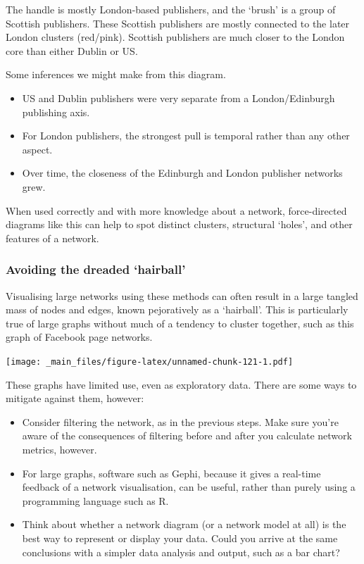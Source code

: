 \documentclass[
]{book}
\begin{document}
The handle is mostly London-based publishers, and the `brush' is a group of Scottish publishers. These Scottish publishers are mostly connected to the later London clusters (red/pink). Scottish publishers are much closer to the London core than either Dublin or US.

Some inferences we might make from this diagram.

\begin{itemize}
\item
  US and Dublin publishers were very separate from a London/Edinburgh publishing axis.
\item
  For London publishers, the strongest pull is temporal rather than any other aspect.
\item
  Over time, the closeness of the Edinburgh and London publisher networks grew.
\end{itemize}

When used correctly and with more knowledge about a network, force-directed diagrams like this can help to spot distinct clusters, structural `holes', and other features of a network.

\hypertarget{avoiding-the-dreaded-hairball}{%
\subsubsection{Avoiding the dreaded `hairball'}\label{avoiding-the-dreaded-hairball}}

Visualising large networks using these methods can often result in a large tangled mass of nodes and edges, known pejoratively as a `hairball'. This is particularly true of large graphs without much of a tendency to cluster together, such as this graph of Facebook page networks\citep{musae}.

\texttt{[image: \_main\_files/figure-latex/unnamed-chunk-121-1.pdf]}

These graphs have limited use, even as exploratory data. There are some ways to mitigate against them, however:

\begin{itemize}
\item
  Consider filtering the network, as in the previous steps. Make sure you're aware of the consequences of filtering before and after you calculate network metrics, however.
\item
  For large graphs, software such as Gephi, because it gives a real-time feedback of a network visualisation, can be useful, rather than purely using a programming language such as R.
\item
  Think about whether a network diagram (or a network model at all) is the best way to represent or display your data. Could you arrive at the same conclusions with a simpler data analysis and output, such as a bar chart?
\end{itemize}
\end{document}
